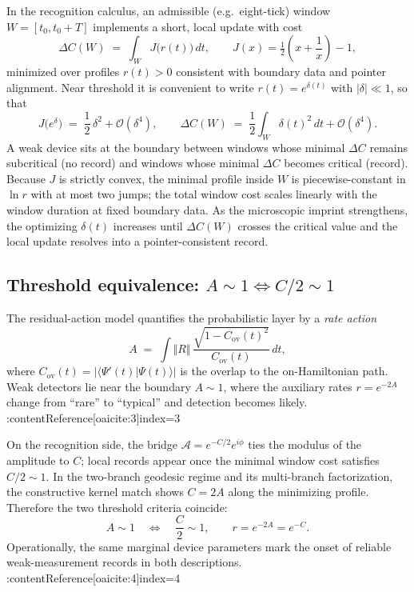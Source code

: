 \documentclass[11pt,letterpaper]{article}
\begin{document}
In the recognition calculus, an admissible (e.g.\ eight-tick) window $W=[t_0,t_0+T]$ implements a short, local update with cost
\begin{equation}
\Delta C(W)\;=\;\int_{W}\!J\!\bigl(r(t)\bigr)\,dt,
\qquad
J(x)=\tfrac12\!\left(x+\frac1x\right)-1,
\end{equation}
minimized over profiles $r(t)>0$ consistent with boundary data and pointer alignment. Near threshold it is convenient to write $r(t)=e^{\delta(t)}$ with $\vert \delta\vert\ll 1$, so that
\begin{equation}
J\!\bigl(e^{\delta}\bigr)\;=\;\frac12\,\delta^2+\mathcal O(\delta^4),
\qquad
\Delta C(W)\;=\;\frac12\int_{W}\!\delta(t)^2\,dt+\mathcal O(\delta^4).
\end{equation}
A weak device sits at the boundary between windows whose minimal $\Delta C$ remains subcritical (no record) and windows whose minimal $\Delta C$ becomes critical (record). Because $J$ is strictly convex, the minimal profile inside $W$ is piecewise-constant in $\ln r$ with at most two jumps; the total window cost scales linearly with the window duration at fixed boundary data. As the microscopic imprint strengthens, the optimizing $\delta(t)$ increases until $\Delta C(W)$ crosses the critical value and the local update resolves into a pointer-consistent record.

\subsection{Threshold equivalence: \texorpdfstring{$A\sim 1 \Longleftrightarrow C/2\sim 1$}{A\textasciitilde1 <=> C/2\textasciitilde1}}

The residual-action model quantifies the probabilistic layer by a \emph{rate action}
\begin{equation}
A\;=\;\int\!\Vert R\Vert\,\frac{\sqrt{1-C_{\mathrm{ov}}(t)^2}}{C_{\mathrm{ov}}(t)}\,dt,
\end{equation}
where $C_{\mathrm{ov}}(t)=\vert\langle\Psi'(t)\vert\Psi(t)\rangle\vert$ is the overlap to the on-Hamiltonian path. Weak detectors lie near the boundary $A\sim 1$, where the auxiliary rates $r=e^{-2A}$ change from ``rare'' to ``typical'' and detection becomes likely. :contentReference[oaicite:3]{index=3}

On the recognition side, the bridge $\mathcal A=e^{-C/2}e^{i\phi}$ ties the modulus of the amplitude to $C$; local records appear once the minimal window cost satisfies $C/2\sim 1$. In the two-branch geodesic regime and its multi-branch factorization, the constructive kernel match shows $C=2A$ along the minimizing profile. Therefore the two threshold criteria coincide:
\begin{equation}
A\sim 1 \quad\Longleftrightarrow\quad \frac{C}{2}\sim 1,
\qquad
r=e^{-2A}=e^{-C}.
\end{equation}
Operationally, the same marginal device parameters mark the onset of reliable weak-measurement records in both descriptions. :contentReference[oaicite:4]{index=4}
\end{document}

